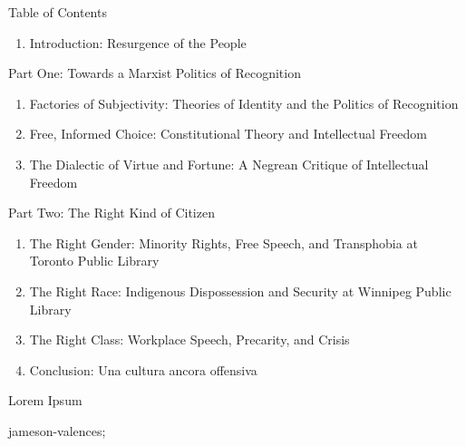 
\def\mytitle{DissertationText}
\def\myauthor{redlibrarian}
\def\baseheaderlevel2{}
\def\bibtexbibliography.bib{}
\def\latexfooterdiss-footer{}
\def\bibliostyleapacite{}
\def\authorsampopowich{}
\def\quoteslanguageenglish{}
\def\latexinputdiss-input{}


Table of Contents

\begin{enumerate}
\item Introduction: Resurgence of the People

\end{enumerate}

Part One: Towards a Marxist Politics of Recognition

\begin{enumerate}
\item Factories of Subjectivity: Theories of Identity and the Politics of Recognition

\item Free, Informed Choice: Constitutional Theory and Intellectual Freedom

\item The Dialectic of Virtue and Fortune: A Negrean Critique of Intellectual Freedom

\end{enumerate}

Part Two: The Right Kind of Citizen

\begin{enumerate}
\item The Right Gender: Minority Rights, Free Speech, and Transphobia at Toronto Public Library

\item The Right Race: Indigenous Dispossession and Security at Winnipeg Public Library

\item The Right Class: Workplace Speech, Precarity, and Crisis

\item Conclusion: Una cultura ancora offensiva

\end{enumerate}

\newpage

Lorem Ipsum \citet{jameson-valences}

\newpage

\newpage

\newpage

\newpage

\begin{thebibliography}{0}

jameson-valences;
\end{thebibliography}



